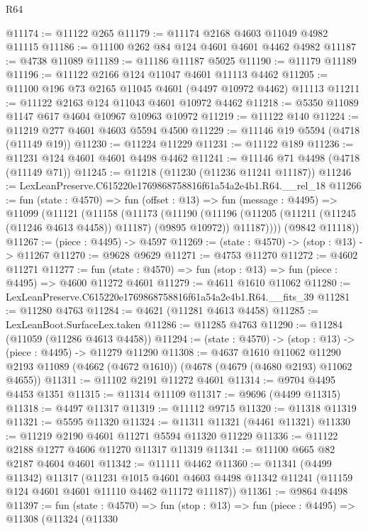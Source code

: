 \begin{lexlean}{R64}
\begin{coremodule}
@11174 := @11122 @265
@11179 := @11174 @2168 @4603 @11049 @4982 @11115
@11186 := @11100 @262 @84 @124 @4601 @4601 @4462 @4982
@11187 := @4738 @11089
@11189 := @11186 @11187 @5025
@11190 := @11179 @11189
@11196 := @11122 @2166 @124 @11047 @4601 @11113 @4462
@11205 := @11100 @196 @73 @2165 @11045 @4601 (@4497 @10972 @4462) @11113
@11211 := @11122 @2163 @124 @11043 @4601 @10972 @4462
@11218 := @5350 @11089 @1147 @617 @4604 @10967 @10963 @10972
@11219 := @11122 @140
@11224 := @11219 @277 @4601 @4603 @5594 @4500
@11229 := @11146 @19 @5594 (@4718 (@11149 @19))
@11230 := @11224 @11229
@11231 := @11122 @189
@11236 := @11231 @124 @4601 @4601 @4498 @4462
@11241 := @11146 @71 @4498 (@4718 (@11149 @71))
@11245 := @11218 (@11230 (@11236 @11241 @11187))
@11246 := LexLeanPreserve.C615220e1769868758816f61a54a2e4b1.R64.__rel_18
@11266 := fun (state : @4570) =>
  fun (offset : @13) =>
  fun (message : @4495) =>
  @11099
    (@11121
      (@11158
        (@11173
          (@11190
            (@11196 (@11205 (@11211 (@11245 (@11246 @4613 @4458)) @11187) (@9895 @10972)) @11187))))
      (@9842 @11118))
@11267 := (piece : @4495) -> @4597
@11269 := (state : @4570) -> (stop : @13) -> @11267
@11270 := @9628 @9629
@11271 := @4753 @11270
@11272 := @4602 @11271
@11277 := fun (state : @4570) => fun (stop : @13) => fun (piece : @4495) => @4600 @11272 @4601
@11279 := @4611 @1610 @11062
@11280 := LexLeanPreserve.C615220e1769868758816f61a54a2e4b1.R64.__fits_39
@11281 := @11280 @4763
@11284 := @4621 (@11281 @4613 @4458)
@11285 := LexLeanBoot.SurfaceLex.taken
@11286 := @11285 @4763
@11290 := @11284 (@11059 (@11286 @4613 @4458))
@11294 := (state : @4570) -> (stop : @13) -> (piece : @4495) -> @11279 @11290
@11308 := @4637
    @1610
    @11062
    @11290
    @2193
    @11089
    (@4662 (@4672 @1610))
    (@4678 (@4679 (@4680 @2193) @11062 @4655))
@11311 := @11102 @2191 @11272 @4601
@11314 := @9704 @4495 @4453 @1351
@11315 := @11314 @11109
@11317 := @9696 (@4499 @11315)
@11318 := @4497 @11317
@11319 := @11112 @9715
@11320 := @11318 @11319
@11321 := @5595 @11320
@11324 := @11311 @11321 (@4461 @11321)
@11330 := @11219 @2190 @4601 @11271 @5594 @11320 @11229
@11336 := @11122 @2188 @1277 @4606 @11270 @11317 @11319
@11341 := @11100 @665 @82 @2187 @4604 @4601
@11342 := @11111 @4462
@11360 := @11341
    (@4499 @11342)
    @11317
    (@11231
      @1015
      @4601
      @4603
      @4498
      @11342
      @11241
      (@11159 @124 @4601 @4601 @11110 @4462 @11172 @11187))
@11361 := @9864 @4498
@11397 := fun (state : @4570) =>
  fun (stop : @13) =>
  fun (piece : @4495) =>
  @11308
    (@11324
      (@11330

\end{coremodule}
\end{lexlean}
